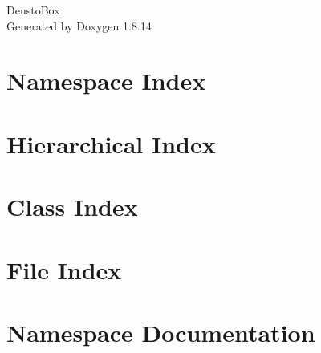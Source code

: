 \documentclass[twoside]{book}
\newcommand{\+}{\discretionary{\mbox{\scriptsize$\hookleftarrow$}}{}{}}
\newcommand{\clearemptydoublepage}{%
  \newpage{\pagestyle{empty}\cleardoublepage}%
}
\begin{document}
\hypersetup{pageanchor=false,
             bookmarksnumbered=true,
             pdfencoding=unicode
            }
\begin{titlepage}
\vspace*{7cm}
\begin{center}%
{\Large Deusto\+Box }\\
\vspace*{1cm}
{\large Generated by Doxygen 1.8.14}\\
\end{center}
\end{titlepage}
\clearemptydoublepage
{}
\tableofcontents
\clearemptydoublepage
{}
\hypersetup{pageanchor=true}

\chapter{Namespace Index}

\chapter{Hierarchical Index}

\chapter{Class Index}

\chapter{File Index}

\chapter{Namespace Documentation}






















\end{document}
